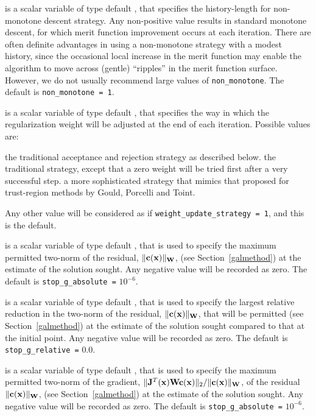 \documentclass{galahad}
\begin{document}
\begin{description}
 is a scalar variable of type default \integer, that
specifies the history-length for non-monotone descent strategy.
Any non-positive value results in standard monotone descent, for which
merit function improvement occurs at each iteration. There are often
definite advantages in using a non-monotone strategy with a modest history,
since the occasional local increase in the merit function may
enable the algorithm to move across (gentle) ``ripples'' in
the merit function surface.
However, we do not usually recommend large values of {\tt non\_monotone}.
The default is {\tt non\_monotone = 1}.

 is a scalar variable of type default \integer,
that specifies the way in which the regularization weight will be adjusted
at the end of each iteration. Possible values are:
\begin{description}
 the traditional acceptance and rejection strategy as described below.
 the traditional strategy, except that a zero weight will be tried
first after a very successful step.
 a more sophisticated strategy that mimics that proposed
for trust-region methods by Gould, Porcelli and Toint.
\end{description}
Any other value will be considered as if {\tt weight\_update\_strategy = 1},
and this is the default.

 is a scalar variable of type default \realdp,
that is used to specify the maximum permitted two-norm of the
residual, $\|{\mathbf{c}}({\mathbf{x}})\|_{{\mathbf{W}}}$,
(see Section~\ref{galmethod}) at the estimate of the solution sought.
Any negative value will be recorded as zero.
The default is {\tt stop\_g\_absolute =} $10^{-6}$.

 is a scalar variable of type default \realdp,
that is used to specify the largest relative reduction in the two-norm of the
residual, $\|{\mathbf{c}}({\mathbf{x}})\|_{{\mathbf{W}}}$, that will be permitted
(see Section~\ref{galmethod}) at the estimate of the solution sought
compared to that at the initial point.
Any negative value will be recorded as zero.
The default is {\tt stop\_g\_relative =} $0.0$.

 is a scalar variable of type default \realdp,
that is used to specify the maximum permitted two-norm of the gradient,
 $\|{\mathbf{J}}^T({\mathbf{x}}) {\mathbf{W}} {\mathbf{c}}({\mathbf{x}})\|_2/\|{\mathbf{c}}({\mathbf{x}})\|_{{\mathbf{W}}}$,
of the residual  $\|{\mathbf{c}}({\mathbf{x}})\|_{{\mathbf{W}}}$,
(see Section~\ref{galmethod}) at the estimate of the solution sought.
Any negative value will be recorded as zero.
The default is {\tt stop\_g\_absolute =} $10^{-6}$.


\end{description}
\end{document}
